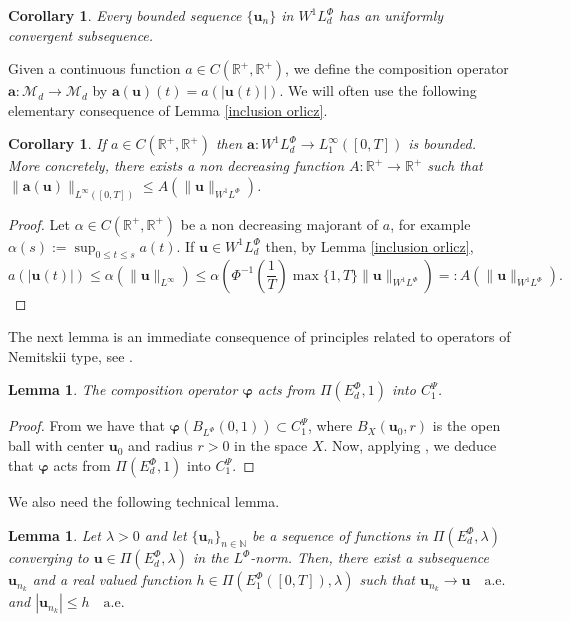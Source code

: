 \documentclass[twoside]{elsarticle}
\newtheorem{cor}[thm]{Corollary}
\newtheorem{lem}[thm]{Lemma}
\theoremstyle{remark}
\newcommand{\lphi}{L^{\Phi}}
\newcommand{\ephi}{E^{\Phi}}
\newcommand{\wphi}{W^{1}\lphi}
\renewcommand{\b}[1]{\boldsymbol{#1}}
\renewcommand{\leq}{\leqslant}
\begin{document}
 \begin{cor}\label{unif_conv} Every bounded sequence $\{\b{u}_n\}$ in  $\wphi_d$  has an uniformly convergent subsequence. 
\end{cor}


 Given a continuous function $a\in C(\mathbb{R}^+,\mathbb{R}^+)$, we define the composition operator $\b{a}:\mathcal{M}_d\to \mathcal{M}_d$ by $\b{a}(\b{u})(t)= a(|\b{u}(t)|)$.
We will often use the following elementary consequence of Lemma \ref{inclusion orlicz}. 
\begin{cor}\label{a_bound} If $a\in C(\mathbb{R}^+,\mathbb{R}^+)$ then $\b{a}:\wphi_d\to L^{\infty}_1([0,T])$ is bounded. 
More concretely,  there exists a non decreasing function $A:\mathbb{R}^+\to\mathbb{R}^+$ such that
 $\|\b{a}(\b{u})\|_{L^{\infty}([0,T])}\leq A(\|\b{u}\|_{\wphi})$.
\end{cor}

\begin{proof}  Let $\alpha\in C(\mathbb{R}^+,\mathbb{R}^+)$ be a  non decreasing  majorant of $a$, for example 
$\alpha(s):=\sup_{0\leq t\leq s}a(t)$.  If $\b{u}\in \wphi_d$ then, by Lemma \ref{inclusion orlicz}, 
\[a(|\b{u}(t)|)\leq \alpha(\|\b{u}\|_{L^{\infty}})\leq 
\alpha\left(\Phi^{-1}\left(\frac{1}{T}\right)\max\{1,T\} \|\b{u}\|_{\wphi}\right)=: 
A(\|\b{u}\|_{\wphi}).\]
\end{proof}


The next lemma is an immediate consequence of principles  related to  operators of Nemitskii type, see \cite[]{KR}.

\begin{lem}\label{phi_comp}   
The  composition operator  $\boldsymbol{\varphi}$  acts from $\Pi(\ephi_d,1)$ into $C_1^{\Psi}$.
\end{lem}
\begin{proof}
From \cite[Lemma 9.1]{KR} we have that  $\boldsymbol{\varphi}\left(B_{\lphi}(0,1)\right)\subset C_1^{\Psi}$, where
$B_{X}(\b{u}_0,r)$ is the open ball with center $\b{u}_0$ and radius $r>0$ in the space $X$. Now, applying \cite[Lemma 17.1]{KR}, we deduce that $\boldsymbol{\varphi}$ acts from $\Pi(\ephi_d,1)$ into $C_1^{\Psi}$.
\end{proof}

We also need the following technical lemma.
\begin{lem}\label{segundo lema}
Let $\lambda>0$ and let $\{\b{u}_n\}_{n\in \mathbb{N}}$ be a sequence of  functions in $\Pi(\ephi_d,\lambda)$ converging to  $\b{u}\in \Pi(\ephi_d,\lambda)$  in the $\lphi$-norm. Then, there exist a subsequence
$\b{u}_{n_k}$ and a real valued function $h\in\Pi\left(\ephi_1\left([0,T]\right),\lambda\right)$ such that $\b{u}_{n_k}\rightarrow \b{u} \quad\text{a.e.}$ and $|\b{u}_{n_k}|\leq h\quad\text{a.e.}$
\end{lem}
\end{document}

